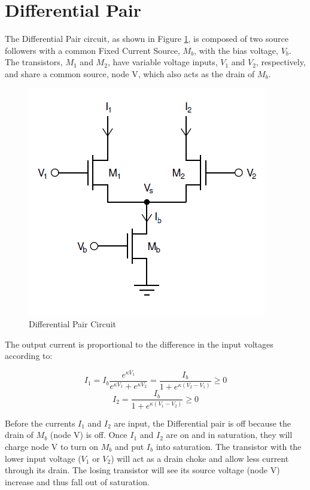 \documentclass[main]{subfiles}
\begin{document}

\section{Differential Pair}

The Differential Pair circuit, as shown in Figure \ref{fig:Differential_pair_circuit}, is composed of two source followers with a common Fixed Current Source, $M_b$, with the bias voltage, $V_b$. The transistors, $M_1$ and $M_2$, have variable voltage inputs, $V_1$ and $V_2$, respectively, and share a common source, node V, which also acts as the drain of $M_b$. 

\begin{figure}[htbp]
  \centering
  \includegraphics[scale=0.8]{figs/Differential_pair_circuit.png}
  \caption{Differential Pair Circuit}
  \label{fig:Differential_pair_circuit}
\end{figure}


The output current is proportional to the difference in the input voltages according to: 

\begin{equation}
I_1 = I_b\frac{e^{\kappa V_1}}{e^{ \kappa V_1}+e^{\kappa V_2}} = \frac{I_b}{1+ e^{\kappa(V_2-V_1)}}  \geq 0
\end{equation}
\begin{equation}
I_2 = \frac{I_b}{1+e^{\kappa(V_1-V_2)}} \geq 0
\end{equation}

Before the currents $I_1$ and $I_2$ are input, the Differential pair is off because the drain of $M_b$ (node V) is off. Once $I_1$ and $I_2$ are on and in saturation, they will charge node V to turn on $M_b$ and put $I_b$ into saturation. The transistor with the lower input voltage ($V_1$ or $V_2$) will act as a drain choke and allow less current through its drain. The losing transistor will see its source voltage (node V) increase and thus fall out of saturation. 
\end{document}
